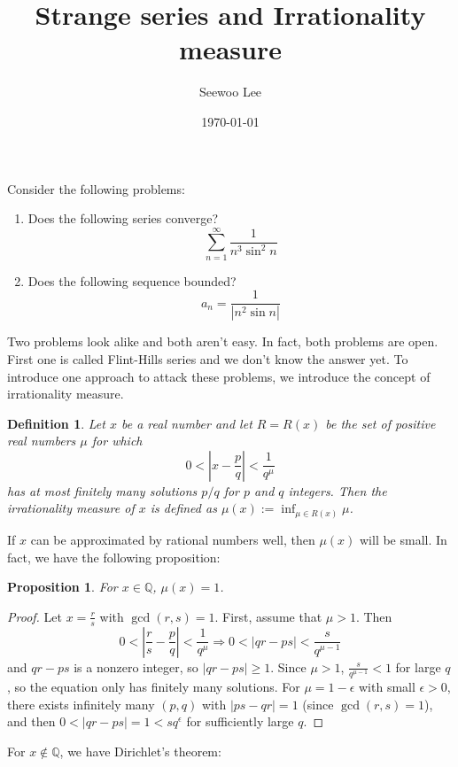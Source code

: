 \documentclass{article}
\title{Strange series and Irrationality measure}
\author{Seewoo Lee}
\date{\today}
\newtheorem{definition}{Definition}
\newtheorem{proposition}{Proposition}
\begin{document}
\maketitle

Consider the following problems:
\begin{enumerate}
\item Does the following series converge?
$$
\sum_{n=1}^{\infty} \frac{1}{n^{3}\sin^{2}n}
$$
\item Does the following sequence bounded?
$$
a_{n} = \frac{1}{|n^{2}\sin n|}
$$
\end{enumerate}
Two problems look alike and both aren't easy. In fact, both problems are open. First one is called Flint-Hills series and we don't know the answer yet. 
To introduce one approach to attack these problems, we introduce the concept of irrationality measure. 

\begin{definition}
Let $x$ be a real number and let $R = R(x)$ be the set of positive real numbers $\mu$ for which 
$$
0<\left|x -\frac{p}{q}\right| < \frac{1}{q^{\mu}}
$$
has at most finitely many solutions $p/q$ for $p$ and $q$ integers. Then the irrationality measure of $x$ is defined as 
$\mu(x):= \inf_{\mu\in R(x)} \mu$. 
\end{definition}
If $x$ can be approximated by rational numbers well, then $\mu(x)$ will be small. In fact, we have the following proposition:
\begin{proposition}
For $x\in \mathbb{Q}$, $\mu(x) = 1$. 
\end{proposition}
\begin{proof}
Let $x = \frac{r}{s}$ with $\gcd(r, s) = 1$. First, assume that $\mu>1$. Then 
$$
0< \left| \frac{r}{s} - \frac{p}{q} \right| < \frac{1}{q^{\mu}} \Rightarrow 0< |qr - ps| < \frac{s}{q^{\mu-1}}
$$
and $qr-ps$ is a nonzero integer, so $|qr-ps|\geq 1$. Since $\mu>1$, $\frac{s}{q^{\mu-1}}<1$ for large $q$, so the equation only has finitely many solutions. 
For $\mu = 1-\epsilon$ with small $\epsilon>0$, there exists infinitely many $(p, q)$ with $|ps-qr|=1$ (since $\gcd(r, s)=1$), and then $0<|qr-ps| =1< sq^{\epsilon}$ for sufficiently large $q$. 
\end{proof}

For $x\not\in \mathbb{Q}$, we have Dirichlet's theorem:
\end{document}
